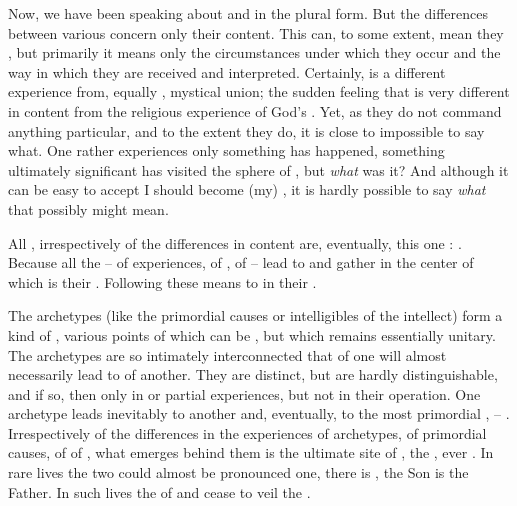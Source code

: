 \pa Now, we have been speaking about  and  in the
plural form. But the differences between various  concern only
their content. This can, to some extent, mean  they , but
primarily it means only the circumstances under which they occur and the way in
which they are received and interpreted.  Certainly, 
 is a different experience from, equally ,
mystical union; the sudden feeling that 
is very different in content from the religious experience of God's .
Yet, as  they do not command anything particular, and to the extent
they do, it is close to impossible to say what. One rather experiences only
 something has happened, something ultimately significant has visited
the sphere of , but {\em what} was it? And although it can be easy
to accept  I should become (my) , it is hardly possible to say
{\em what} that possibly might mean.

All , irrespectively of the differences in content are, eventually,
this one : . Because all the  -- of
 experiences, of , of  -- lead to and gather in
the center of  which is their . Following these 
means to  in their .

The archetypes (like the primordial causes or intelligibles of the intellect)
form a kind of , various 
points of which can be , but which remains essentially
unitary. The archetypes are so intimately interconnected that
 of one will almost necessarily lead to
 of another. They are distinct, but are hardly
distinguishable, and if so, then only in  or partial
experiences, but not in their operation. One archetype leads
inevitably to another and, eventually, to the most primordial
,  --
.
Irrespectively of the differences in the experiences of archetypes, of
primordial causes, of  of , what emerges behind them
is the ultimate site of , the , ever
.  In rare lives the two could almost be pronounced one,
there  is , the Son is the Father. In such lives the
 of  and  cease to veil the .


